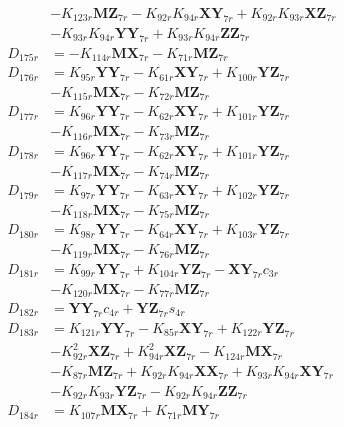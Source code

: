 \begin{multicols}{2}
\begin{align}
&- K_{123r}\mathbf{MZ}_{7r} - K_{92r}K_{94r}\mathbf{XY}_{7r} + K_{92r}K_{93r}\mathbf{XZ}_{7r}  \nonumber \\
&- K_{93r}K_{94r}\mathbf{YY}_{7r} + K_{93r}K_{94r}\mathbf{ZZ}_{7r} \nonumber \\
D_{175r} &= - K_{114r}\mathbf{MX}_{7r} - K_{71r}\mathbf{MZ}_{7r} \nonumber \\
D_{176r} &= K_{95r}\mathbf{YY}_{7r} - K_{61r}\mathbf{XY}_{7r} + K_{100r}\mathbf{YZ}_{7r}  \nonumber \\
&- K_{115r}\mathbf{MX}_{7r} - K_{72r}\mathbf{MZ}_{7r} \nonumber \\
D_{177r} &= K_{96r}\mathbf{YY}_{7r} - K_{62r}\mathbf{XY}_{7r} + K_{101r}\mathbf{YZ}_{7r}  \nonumber \\
&- K_{116r}\mathbf{MX}_{7r} - K_{73r}\mathbf{MZ}_{7r} \nonumber \\
D_{178r} &= K_{96r}\mathbf{YY}_{7r} - K_{62r}\mathbf{XY}_{7r} + K_{101r}\mathbf{YZ}_{7r}  \nonumber \\
&- K_{117r}\mathbf{MX}_{7r} - K_{74r}\mathbf{MZ}_{7r} \nonumber \\
D_{179r} &= K_{97r}\mathbf{YY}_{7r} - K_{63r}\mathbf{XY}_{7r} + K_{102r}\mathbf{YZ}_{7r}  \nonumber \\
&- K_{118r}\mathbf{MX}_{7r} - K_{75r}\mathbf{MZ}_{7r} \nonumber \\
D_{180r} &= K_{98r}\mathbf{YY}_{7r} - K_{64r}\mathbf{XY}_{7r} + K_{103r}\mathbf{YZ}_{7r}  \nonumber \\
&- K_{119r}\mathbf{MX}_{7r} - K_{76r}\mathbf{MZ}_{7r} \nonumber \\
D_{181r} &= K_{99r}\mathbf{YY}_{7r} + K_{104r}\mathbf{YZ}_{7r} - \mathbf{XY}_{7r}c_{3r}  \nonumber \\
&- K_{120r}\mathbf{MX}_{7r} - K_{77r}\mathbf{MZ}_{7r} \nonumber \\
D_{182r} &= \mathbf{YY}_{7r}c_{4r} + \mathbf{YZ}_{7r}s_{4r} \nonumber \\
D_{183r} &= K_{121r}\mathbf{YY}_{7r} - K_{85r}\mathbf{XY}_{7r} + K_{122r}\mathbf{YZ}_{7r}  \nonumber \\
&- K_{92r}^2\mathbf{XZ}_{7r} + K_{94r}^2\mathbf{XZ}_{7r} - K_{124r}\mathbf{MX}_{7r}  \nonumber \\
&- K_{87r}\mathbf{MZ}_{7r} + K_{92r}K_{94r}\mathbf{XX}_{7r} + K_{93r}K_{94r}\mathbf{XY}_{7r}  \nonumber \\
&- K_{92r}K_{93r}\mathbf{YZ}_{7r} - K_{92r}K_{94r}\mathbf{ZZ}_{7r} \nonumber \\
D_{184r} &= K_{107r}\mathbf{MX}_{7r} + K_{71r}\mathbf{MY}_{7r} \nonumber \\

\end{align}
\end{multicols}
